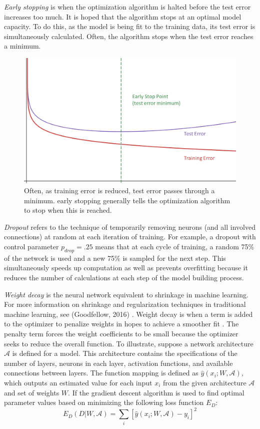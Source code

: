 \textit{Early stopping} is when the optimization algorithm is halted before the test error increases too much.  It is hoped that the algorithm stops at an optimal model capacity. To do this, as the model is being fit to the training data, its test error is simultaneously calculated. 
 Often, the algorithm stops when the test error reaches a minimum. \cite{doan2004generalization}

 \begin{figure}[H]
    \centering
    \vspace{-0pt}
    \includegraphics[width=0.5\linewidth]{Figures/early_stop.png}
    \caption{\footnotesize Often, as training error is reduced, test error passes through a minimum.  early stopping generally tells the optimization algorithm to stop when this is reached.}
    \label{earlystop}
\end{figure}

\textit{Dropout} refers to the technique of temporarily removing neurons (and all involved connections) at random  at each iteration of training.\cite{srivastava2014dropout}  For example, a dropout with control parameter $p_{drop} = .25$ means that at each cycle of training, a random 75\% of the network is used and a new 75\% is sampled for the next step. This simultaneously speeds up computation as well as prevents overfitting because it reduces the number of calculations at each step of the model building process.

\textit{Weight decay} is the neural network equivalent to shrinkage in machine learning.  For more information on shrinkage and regularization techniques in traditional machine learning, see (Goodfellow, 2016) \cite{Goodfellow-et-al-2016}.
Weight decay is when a  term is added to the optimizer to penalize weights in hopes to achieve a smoother fit \cite{mackay1992practical}.  The penalty term forces the weight coefficients to be small because the optimizer seeks to reduce the overall function.  To illustrate, suppose a network architecture $\mathcal{A}$ is defined for a model.  This architecture contains the specifications of the number of layers, neurons in each layer, activation functions, and available connections between layers.  The function mapping is defined as $\hat{y}(x_i;W,\mathcal{A})$, which outputs an estimated value for each input $x_i$ from the given architecture $\mathcal{A}$ and set of weights $W$.  If the gradient descent algorithm is used to find optimal parameter values based on minimizing the following loss function $E_D$:
$$
E_D(D|W,\mathcal{A}) = \sum_i [\hat{y}(x_i;W,\mathcal{A}) - y_i]^2
$$

